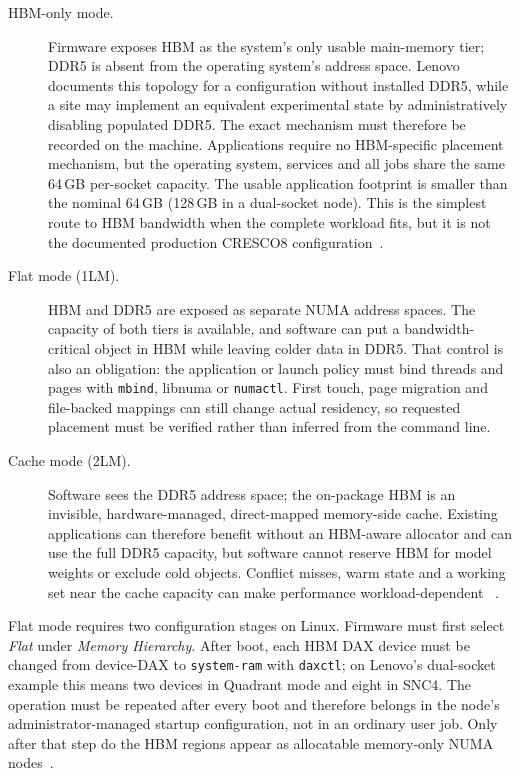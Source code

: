 \begin{description}
  \item[HBM-only mode.] Firmware exposes HBM as the system's only usable
  main-memory tier; DDR5 is absent from the operating system's address
  space.  Lenovo documents this topology for a configuration without
  installed DDR5, while a site may implement an equivalent experimental
  state by administratively disabling populated DDR5.  The exact
  mechanism must therefore be recorded on the machine.  Applications
  require no HBM-specific placement mechanism, but the operating system,
  services and all jobs share the same 64\,GB per-socket capacity.  The
  usable application footprint is smaller than the nominal 64\,GB
  (128\,GB in a dual-socket node).  This is the simplest route to HBM
  bandwidth when the complete workload fits, but it is not the documented
  production CRESCO8 configuration~\cite{lp1738}.

  \item[Flat mode (1LM).] HBM and DDR5 are exposed as separate NUMA
  address spaces.  The capacity of both tiers is available, and software
  can put a bandwidth-critical object in HBM while leaving colder data in
  DDR5.  That control is also an obligation: the application or launch
  policy must bind threads and pages with \texttt{mbind}, libnuma or
  \texttt{numactl}.  First touch, page migration and file-backed mappings
  can still change actual residency, so requested placement must be
  verified rather than inferred from the command line.

  \item[Cache mode (2LM).] Software sees the DDR5 address space; the
  on-package HBM is an invisible, hardware-managed, direct-mapped
  memory-side cache.  Existing applications can therefore benefit
  without an HBM-aware allocator and can use the full DDR5 capacity, but
  software cannot reserve HBM for model weights or exclude cold objects.
  Conflict misses, warm state and a working set near the cache capacity
  can make performance workload-dependent
  ~\cite{lp1738,ibeid2025aurora}.
\end{description}

Flat mode requires two configuration stages on Linux.  Firmware must
first select \emph{Flat} under \emph{Memory Hierarchy}.  After boot, each
HBM DAX device must be changed from device-DAX to
\texttt{system-ram} with \texttt{daxctl}; on Lenovo's dual-socket example
this means two devices in Quadrant mode and eight in SNC4.  The operation
must be repeated after every boot and therefore belongs in the node's
administrator-managed startup configuration, not in an ordinary user
job.  Only after that step do the HBM regions appear as allocatable
memory-only NUMA nodes~\cite{lp1738}.

